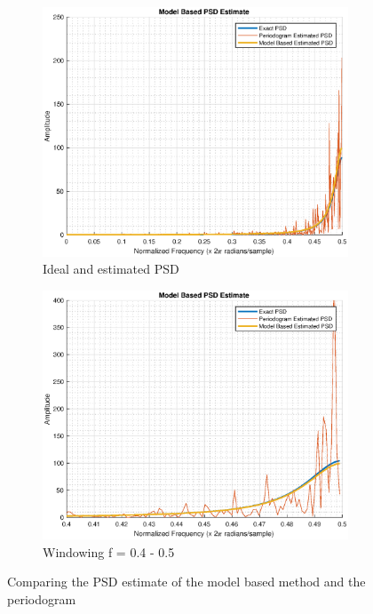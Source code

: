 \documentclass{article}
\begin{document}
\begin{figure}[h!]
\centering
\begin{subfigure}{0.32\textwidth}
\centering
\includegraphics[width = \textwidth]{ar_spec_model}
\caption{Ideal and estimated PSD}
\label{fig:ar_spec_model}
\end{subfigure}
\begin{subfigure}{0.32\textwidth}
\centering
\includegraphics[width = \textwidth]{ar_spec_model_zoom}
\caption{Windowing f = 0.4 - 0.5}
\label{fig:ar_spec_model_zoom}
\end{subfigure}
\caption{Comparing the PSD estimate of the model based method and the periodogram}
\label{fig:ar_spec_modvpgm}
\end{figure}
\end{document}
